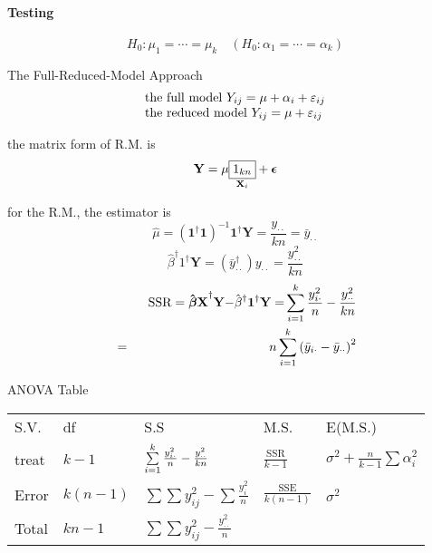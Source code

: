 \documentclass{article}
\begin{document}
\bigskip

\paragraph{Testing}

\begin{equation*}
H_{0}:\mu _{1}=\cdots =\mu _{k}\quad \left( H_{0}:\alpha _{1}=\cdots =\alpha
_{k}\right)
\end{equation*}

\bigskip 

The Full-Reduced-Model Approach%
\begin{equation*}
\begin{tabular}{l}
the full model $Y_{ij}=\mu +\alpha _{i}+\varepsilon _{ij}$ \\ 
the reduced model $Y_{ij}=\mu +\varepsilon _{ij}$%
\end{tabular}%
\end{equation*}

the matrix form of R.M. is%
\begin{equation*}
\mathbf{Y}=\mu \underset{\mathbf{X}_{i}}{\fbox{1$_{kn}$}}+\mathbf{\epsilon }
\end{equation*}

for the R.M., the estimator is%
\begin{equation*}
\hat{\mu}=\left( \mathbf{1}^{\dagger }\mathbf{1}\right) ^{-1}\mathbf{1}%
^{\dagger }\mathbf{Y}=\frac{y_{\cdot \cdot }}{kn}=\bar{y}_{\cdot \cdot }
\end{equation*}%
\begin{equation*}
\hat{\beta}^{\dagger }1^{\dagger }\mathbf{Y=}\left( \bar{y}_{\cdot \cdot
}^{\dagger }\right) y_{\cdot \cdot }=\frac{y_{\cdot \cdot }^{2}}{kn}
\end{equation*}%
\begin{eqnarray*}
&\therefore &\text{SSR}=\mathbf{\hat{\beta}X}^{\dagger }\mathbf{Y-}\hat{\beta%
}^{\dagger }\mathbf{1}^{\dagger }\mathbf{Y=}\sum\limits_{i=1}^{k}\frac{%
y_{i\cdot }^{2}}{n}-\frac{y_{\cdot \cdot }^{2}}{kn} \\
&=&n\sum\limits_{i=1}^{k}\left( \bar{y}_{i\cdot }-\bar{y}_{\cdot \cdot
}\right) ^{2}
\end{eqnarray*}

\bigskip

ANOVA Table

\bigskip 

\begin{tabular}{lllll}
S.V. & df & S.S & M.S. & E(M.S.) \\ 
treat & $k-1$ & $\sum\limits_{i=1}^{k}\frac{y_{i\cdot }^{2}}{n}-\frac{%
y_{\cdot \cdot }^{2}}{kn}$ & $\frac{\text{SSR}}{k-1}$ & $\sigma ^{2}+\frac{n%
}{k-1}\sum \alpha _{i}^{2}$ \\ 
Error & $k\left( n-1\right) $ & $\sum \sum y_{ij}^{2}-\sum \frac{y_{i}^{2}}{n%
}$ & $\frac{\text{SSE}}{k\left( n-1\right) }$ & $\sigma ^{2}$ \\ 
Total & $kn-1$ & $\sum \sum y_{ij}^{2}-\frac{y_{\cdot \cdot }^{2}}{n}$ &  & 
\end{tabular}
\end{document}
